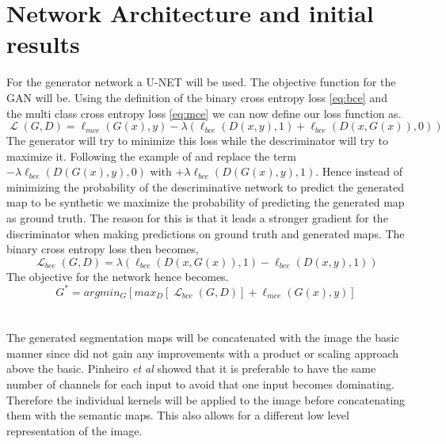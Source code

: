 \documentclass[a4paper,11pt]{article}
\DeclareMathOperator{\Lagr}{\mathcal{L}}
\begin{document}
\section{Network Architecture and initial results}
For the generator network a U-NET will be used. The objective function for the GAN will be.  Using the definition of the binary cross entropy loss \eqref{eq:bce} and the multi class cross entropy loss \eqref{eq:mce} we can now define our loss function as.
\begin{equation}
\Lagr(G, D) = \ell_{mce}(G(x),y)-\lambda(\ell_{bce}(D(x,y), 1)+\ell_{bce}(D(x,G(x)), 0))
\end{equation}
The generator will try to minimize this loss while the descriminator will try to maximize it. Following the example of \cite{goodfellow_generative_2014, luc_semantic_2016} and replace the term $-\lambda\ell_{bce}(D(G(x),y), 0)$ with  $+\lambda\ell_{bce}(D(G(x),y), 1)$. Hence instead of minimizing the probability of the descriminative network to predict the generated map to be synthetic we maximize the probability of predicting the generated map as ground truth. The reason for this is that it leads a stronger gradient for the discriminator when making predictions on ground truth and generated maps. The binary cross entropy loss then becomes,
\begin{equation}
\Lagr_{bce}(G, D) =\lambda(\ell_{bce}(D(x,G(x)), 1)-\ell_{bce}(D(x,y), 1))
\end{equation}
The objective for the network hence becomes.
\begin{equation}
G^{*}=argmin_{G}[max_{D}[\Lagr_{bce}(G, D)] + \ell_{mce}(G(x),y)]
\end{equation}
\\
\\
The generated segmentation maps will be concatenated with the image the basic manner since \cite{luc_semantic_2016} did not gain any improvements with a product or scaling approach above the basic. Pinheiro \textit{et al} \cite{pinheiro_learning_2016} showed that it is preferable to have the same number of channels for each input to avoid that one input becomes dominating. Therefore the individual kernels will be applied to the image before concatenating them with the semantic maps. This also allows for a different low level representation of the image.



\end{document}
